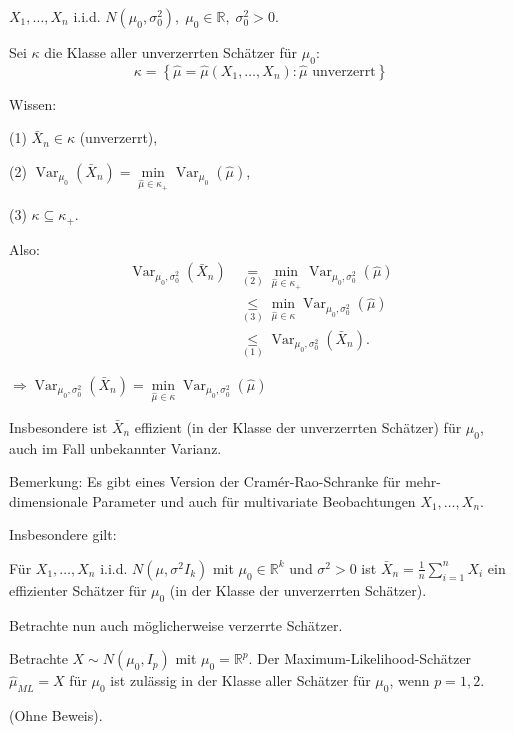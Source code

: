 \documentclass{tstextbook}
\DeclareMathOperator{\Var}{Var}
\newcommand{\R}{\mathbb R}
\begin{document}
\begin{example}
	$ X_1,\ldots,X_n $ i.i.d. $ N(\mu_0,\sigma_0^2), \; \mu_0 \in \R, \; \sigma_0^2 > 0 $.
	
	Sei $ \kappa $ die Klasse aller unverzerrten Schätzer für $ \mu_0 $:
	\[
	\kappa = \left\lbrace \hat{\mu} = \hat{\mu}(X_1,\ldots,X_n) \colon \hat{\mu} \text{ unverzerrt}\right\rbrace
	\]
	
	Wissen: 
	
	(1) $ \bar{X}_n \in \kappa $ (unverzerrt),
	
	(2) $ \Var_{\mu_0}(\bar{X}_n) = \underset{\hat{\mu}\in\kappa_+}{\min}\Var_{\mu_0}(\hat{\mu}) $,
	
	(3) $ \kappa \subseteq \kappa_+ $. 
	
	Also: 
	\[
	\begin{aligned}
		\Var_{\mu_0,\sigma_0^2}(\bar{X}_n) & \underset{(2)}{=} \underset{\hat{\mu}\in\kappa_+}{\min}\Var_{\mu_0, \sigma_0^2}(\hat{\mu}) \\
		& \underset{(3)}{\le} \underset{\hat{\mu}\in\kappa}{\min}\Var_{\mu_0,\sigma_0^2}(\hat{\mu}) \\
		& \underset{(1)}{\le} \Var_{\mu_0,\sigma_0^2}(\bar{X}_n).
	\end{aligned}
	\]
	
	$ \Rightarrow \Var_{\mu_0,\sigma_0^2}(\bar{X}_n) = \underset{\hat{\mu}\in\kappa}{\min}\Var_{\mu_0,\sigma_0^2}(\hat{\mu}) $
	
	Insbesondere ist $ \bar{X}_n $ effizient (in der Klasse der unverzerrten Schätzer) für $ \mu_0 $, auch im Fall unbekannter Varianz.
\end{example}

\begin{remark}
	Bemerkung: Es gibt eines Version der Cramér-Rao-Schranke für mehr-dimensionale Parameter und auch für multivariate Beobachtungen $ X_1,\ldots,X_n $. 
	
	Insbesondere gilt: 
	
	Für $ X_1,\ldots,X_n $ i.i.d. $ N(\mu,\sigma^2I_k) $ mit $ \mu_0 \in \R^k $ und $ \sigma^2 > 0 $ ist $ \bar{X}_n = \frac{1}{n}\sum_{i=1}^{n}X_i $ ein effizienter Schätzer für $ \mu_0 $ (in der Klasse der unverzerrten Schätzer).
\end{remark}

Betrachte nun auch möglicherweise verzerrte Schätzer.

\begin{theorem}
	Betrachte $ X\sim N(\mu_0,I_p) $ mit $ \mu_0 = \R^p $. Der Maximum-Likelihood-Schätzer $ \hat{\mu}_{ML} = X $ für $ \mu_0 $ ist zulässig in der Klasse aller Schätzer für $ \mu_0 $, wenn $ p=1,2. $
\end{theorem}
(Ohne Beweis). 
\end{document}
